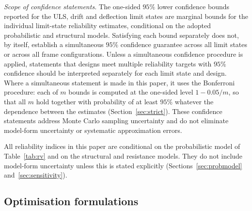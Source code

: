 \emph{Scope of confidence statements.} The one-sided $95\%$ lower confidence bounds reported for the
ULS, drift and deflection limit states are marginal bounds for the individual limit-state reliability
estimates, conditional on the adopted probabilistic and structural models. Satisfying each bound
separately does not, by itself, establish a simultaneous $95\%$ confidence guarantee across all limit
states or across all frame configurations. Unless a simultaneous confidence procedure is applied,
statements that designs meet multiple reliability targets with $95\%$ confidence should be
interpreted separately for each limit state and design. Where a simultaneous statement is made in
this paper, it uses the Bonferroni procedure: each of $m$ bounds is computed at the one-sided level
$1-0.05/m$, so that all $m$ hold together with probability of at least $95\%$ whatever the dependence
between the estimates (Section~\ref{sec:strict}). These confidence statements address Monte Carlo
sampling uncertainty and do not eliminate model-form uncertainty or systematic approximation errors.

All reliability indices in this paper are conditional on the probabilistic model of
Table~\ref{tab:rv} and on the structural and resistance models. They do not include model-form
uncertainty unless this is stated explicitly (Sections~\ref{sec:probmodel} and~\ref{sec:sensitivity}).

\subsection{Optimisation formulations}\label{sec:optimisation}

